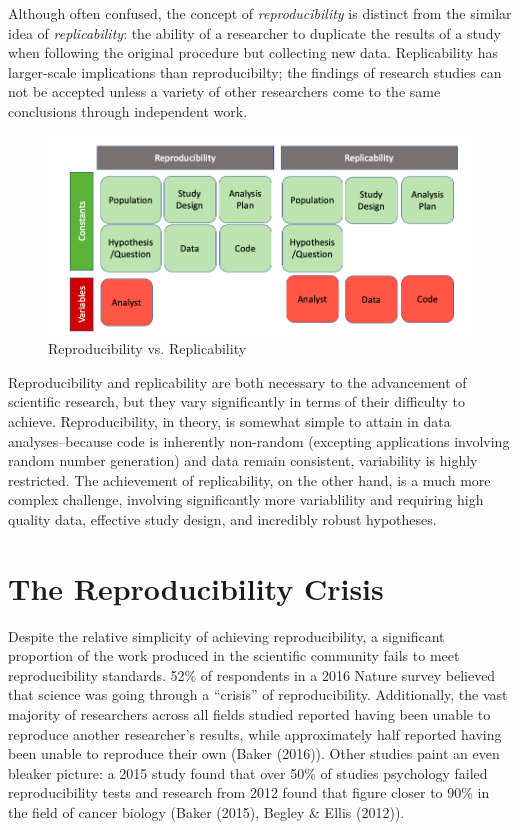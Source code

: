 \documentclass[12pt,twoside]{reedthesis}
\begin{document}
Although often confused, the concept of \emph{reproducibility} is distinct from the similar idea of \emph{replicability}: the ability of a researcher to duplicate the results of a study when following the original procedure but collecting new data. Replicability has larger-scale implications than reproducibilty; the findings of research studies can not be accepted unless a variety of other researchers come to the same conclusions through independent work.
\begin{figure}

{\centering \includegraphics[width=1\linewidth]{figure/versus} 

}

\caption{Reproducibility vs. Replicability}\label{fig:unnamed-chunk-3}
\end{figure}
Reproducibility and replicability are both necessary to the advancement of scientific research, but they vary significantly in terms of their difficulty to achieve. Reproducibility, in theory, is somewhat simple to attain in data analyses--because code is inherently non-random (excepting applications involving random number generation) and data remain consistent, variability is highly restricted. The achievement of replicability, on the other hand, is a much more complex challenge, involving significantly more variablility and requiring high quality data, effective study design, and incredibly robust hypotheses.

\hypertarget{the-reproducibility-crisis}{%
\section{The Reproducibility Crisis}\label{the-reproducibility-crisis}}

Despite the relative simplicity of achieving reproducibility, a significant proportion of the work produced in the scientific community fails to meet reproducibility standards. 52\% of respondents in a 2016 Nature survey believed that science was going through a ``crisis'' of reproducibility. Additionally, the vast majority of researchers across all fields studied reported having been unable to reproduce another researcher's results, while approximately half reported having been unable to reproduce their own (Baker (2016)). Other studies paint an even bleaker picture: a 2015 study found that over 50\% of studies psychology failed reproducibility tests and research from 2012 found that figure closer to 90\% in the field of cancer biology (Baker (2015), Begley \& Ellis (2012)).
\end{document}
